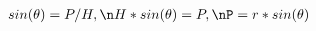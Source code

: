 \documentclass[preview]{standalone}
\begin{document}
\begin{align*}
sin(\theta)=P/H,\n H*sin(\theta)=P,\nP=r*sin(\theta)
\end{align*}
\end{document}
